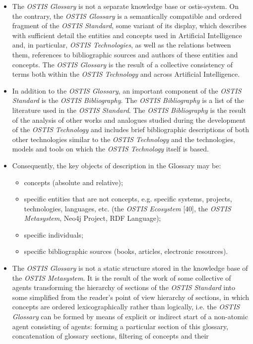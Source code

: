 \documentclass[10 pt]{extarticle}
\begin{document}
\begin{multicols}{2}
\begin{itemize}
    \item The \textit{OSTIS Glossary} is not a separate knowledge
base or ostis-system. On the contrary, the \textit{OSTIS
Glossary} is a semantically compatible and ordered
fragment of the \textit{OSTIS Standard}, some variant of
its display, which describes with sufficient detail
the entities and concepts used in Artificial Intelligence and, in particular, \textit{OSTIS Technologies}, as
well as the relations between them, references to
bibliographic sources and authors of these entities
and concepts. The \textit{OSTIS Glossary} is the result of
a collective consistency of terms both within the
\textit{OSTIS Technology} and across Artificial Intelligence.
    \item \setlength{\parskip}{0 pt} In addition to the \textit{OSTIS Glossary}, an important
component of the \textit{OSTIS Standard} is the \textit{OSTIS
Bibliography}. The \textit{OSTIS Bibliography} is a list of
the literature used in the \textit{OSTIS Standard}. The
\textit{OSTIS Bibliography} is the result of the analysis
of other works and analogues studied during the
development of the \textit{OSTIS Technology} and includes
brief bibliographic descriptions of both other technologies similar to the \textit{OSTIS Technology} and the
technologies, models and tools on which the \textit{OSTIS
Technology} itself is based.
    \item  Consequently, the key objects of description in the
Glossary may be:
        \begin{itemize}
            \item  concepts (absolute and relative);
            \item specific entities that are not concepts, e.g. specific
systems, projects, technologies, languages, etc.
(the \textit{OSTIS Ecosystem} [40], the \textit{OSTIS Metasystem}, Neo4j Project, RDF Language);
        \item  specific individuals;
        \item  specific bibliographic sources (books, articles,
electronic resources).
        \end{itemize}
    \item  The \textit{OSTIS Glossary} is not a static structure stored
in the knowledge base of the \textit{OSTIS Metasystem}. It is the result of the work of some collective of agents transforming the hierarchy of sections of the \textit{OSTIS Standard} into some simplified from the reader’s point of view hierarchy of sections, in which concepts are ordered lexicographically rather than logically, i.e. the \textit{OSTIS Glossary} can be formed by means of explicit or indirect start of a non-atomic agent consisting of agents: forming a particular section of this glossary, concatenation of glossary sections, filtering of concepts and their

\end{itemize}
\end{multicols}
\end{document}
